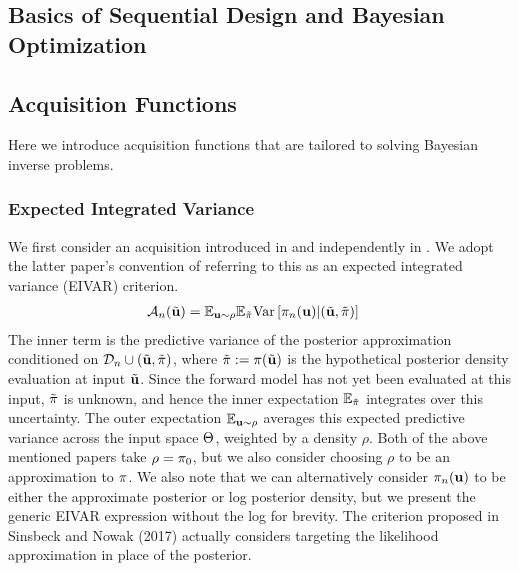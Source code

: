 \documentclass[12pt]{article}
\begin{document}
\subsection{Basics of Sequential Design and Bayesian Optimization}

\subsection{Acquisition Functions}
Here we introduce acquisition functions that are tailored to solving Bayesian inverse problems. 

\subsubsection{Expected Integrated Variance}
We first consider an acquisition introduced in \cite{SinsbeckNowak} and independently 
in \cite{sürer2023sequential}. We adopt the latter paper's convention of referring to this as an expected integrated variance (EIVAR) criterion. 
\begin{align}
\mathcal{A}_{n}(\tilde{\mathbf{u}}) &= \mathbb{E}_{\mathbf{u} \sim \rho} \mathbb{E}_{\tilde{\pi}} \mathrm{Var}\left[\pi_{n}(\mathbf{u}) | (\tilde{\mathbf{u}}, \tilde{\pi}) \right] \label{EIVAR}
\end{align}
The inner term is the predictive variance of the posterior approximation conditioned on $\mathcal{D}_{n} \cup (\tilde{\mathbf{u}}, \tilde{\pi})$, where 
$\tilde{\pi} := \pi(\tilde{\mathbf{u}})$ is the hypothetical posterior density evaluation at input $\tilde{\mathbf{u}}$. Since the forward model has not yet been evaluated at 
this input, $\tilde{\pi}$ is unknown, and hence the inner expectation $\mathbb{E}_{\tilde{\pi}}$ integrates over this uncertainty. The outer expectation $\mathbb{E}_{\mathbf{u} \sim \rho}$
averages this expected predictive variance across the input space $\Theta$, weighted by a density $\rho$. Both of the above mentioned papers take $\rho = \pi_0$, but we 
also consider choosing $\rho$ to be an approximation to $\pi$. We also note that we can alternatively consider $\pi_{n}(\mathbf{u})$ to be either the 
approximate posterior or log posterior density, but we present the generic EIVAR expression without the log for brevity. The criterion proposed in Sinsbeck and Nowak (2017) actually 
considers targeting the likelihood approximation in place of the posterior. 
\end{document}
